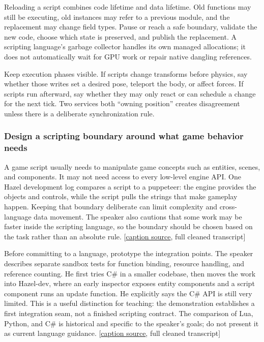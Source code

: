 Reloading a script combines code lifetime and data lifetime. Old functions may still be executing, old instances may refer to a previous module, and the replacement may change field types. Pause or reach a safe boundary, validate the new code, choose which state is preserved, and publish the replacement. A scripting language's garbage collector handles its own managed allocations; it does not automatically wait for GPU work or repair native dangling references.

Keep execution phases visible. If scripts change transforms before physics, say whether those writes set a desired pose, teleport the body, or affect forces. If scripts run afterward, say whether they may only react or can schedule a change for the next tick. Two services both ``owning position'' creates disagreement unless there is a deliberate synchronization rule.

\subsubsection{Design a scripting boundary around what game behavior needs}\label{06-engine-ii-ch040-design-a-scripting-boundary-around-what-game-behavior-needs}

A game script usually needs to manipulate game concepts such as entities, scenes, and components. It may not need access to every low-level engine API. One Hazel development log compares a script to a puppeteer: the engine provides the objects and controls, while the script pulls the strings that make gameplay happen. Keeping that boundary deliberate can limit complexity and cross-language data movement. The speaker also cautions that some work may be faster inside the scripting language, so the boundary should be chosen based on the task rather than an absolute rule. {[}\href{https://www.youtube.com/watch?v=ilqJfU3bUtM}{caption source}, full cleaned transcript{]}

Before committing to a language, prototype the integration points. The speaker describes separate sandbox tests for function binding, resource handling, and reference counting. He first tries C\# in a smaller codebase, then moves the work into Hazel-dev, where an early inspector exposes entity components and a script component runs an update function. He explicitly says the C\# API is still very limited. This is a useful distinction for teaching: the demonstration establishes a first integration seam, not a finished scripting contract. The comparison of Lua, Python, and C\# is historical and specific to the speaker's goals; do not present it as current language guidance. {[}\href{https://www.youtube.com/watch?v=ilqJfU3bUtM}{caption source}, full cleaned transcript{]}

